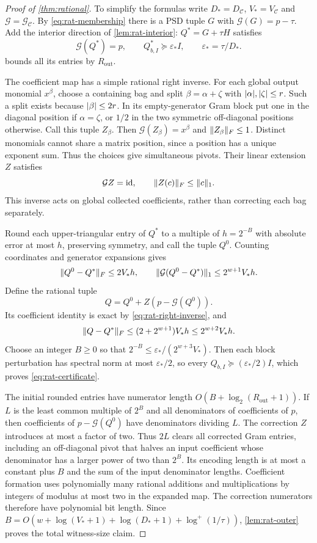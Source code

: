 \begin{proof}[Proof of \cref{thm:rational}]
To simplify the formulas write $D_*=D_{\mathcal C}$,
$V_*=V_{\mathcal C}$ and $\mathcal G=\mathcal G_{\mathcal C}$.
By \eqref{eq:rat-membership} there is a PSD tuple $G$ with
$\mathcal G(G)=p-\tau$. Add the interior direction of
\cref{lem:rat-interior}: $Q^*=G+\tau H$ satisfies
\[
 \mathcal G(Q^*)=p,\qquad Q^*_{b,I}\succeq\varepsilon_* I,
 \qquad\varepsilon_*=\tau/D_*.
\]
 bounds all its entries by $R_{\mathrm{out}}$.

The coefficient map has a simple rational right inverse. For each global
output monomial $x^\beta$, choose a containing bag and split
$\beta=\alpha+\zeta$ with $\lvert \alpha\rvert,\lvert \zeta\rvert\le r$.
Such a split exists because $\lvert \beta\rvert\le2r$.
In its empty-generator Gram block put one in the diagonal position if
$\alpha=\zeta$, or $1/2$ in the two symmetric off-diagonal positions
otherwise. Call this tuple $Z_\beta$. Then
$\mathcal G(Z_\beta)=x^\beta$ and $\lVert Z_\beta\rVert_F\le1$.
Distinct monomials cannot share a matrix position, since a position has a
unique exponent sum. Thus the choices give simultaneous pivots. Their
linear extension $Z$ satisfies
\begin{equation}\label{eq:rat-right-inverse}
 \mathcal G Z=\operatorname{id},\qquad \lVert Z(c)\rVert_F\le\lVert c\rVert_1.
\end{equation}
This inverse acts on global collected coefficients, rather than
correcting each bag separately.

Round each upper-triangular entry of $Q^*$ to a multiple of
$h=2^{-B}$ with absolute error at most $h$, preserving symmetry, and call
the tuple $Q^0$. Counting coordinates and generator expansions gives
\[
 \lVert Q^0-Q^*\rVert_F\le2V_*h,\qquad
 \lVert \mathcal G(Q^0-Q^*)\rVert_1\le2^{w+1}V_*h.
\]
Define the rational tuple
\begin{equation}\label{eq:rat-round-correct}
 Q=Q^0+Z(p-\mathcal G(Q^0)).
\end{equation}
Its coefficient identity is exact by \eqref{eq:rat-right-inverse}, and
\[
 \lVert Q-Q^*\rVert_F\le(2+2^{w+1})V_*h\le2^{w+2}V_*h.
\]
Choose an integer $B\ge0$ so that
$2^{-B}\le\varepsilon_*/(2^{w+3}V_*)$.
Then each block perturbation has spectral norm at most
$\varepsilon_*/2$, so every $Q_{b,I}\succeq(\varepsilon_*/2)I$,
which proves \eqref{eq:rat-certificate}.

The initial rounded entries have numerator length
$O(B+\log_2(R_{\mathrm{out}}+1))$. If $L$ is the least common multiple of
$2^B$ and all denominators of coefficients of $p$, then coefficients of
$p-\mathcal G(Q^0)$ have denominators dividing $L$. The correction $Z$
introduces at most a factor of two. Thus $2L$ clears all corrected Gram
entries, including an off-diagonal pivot that halves an input coefficient
whose denominator has a larger power of two than $2^B$. Its encoding
length is at most a constant plus $B$ and the sum of the input denominator
lengths. Coefficient formation uses polynomially many rational additions
and multiplications by integers of modulus at most two in the expanded
map. The correction numerators therefore have polynomial bit length.
Since $B=O(w+\log(V_*+1)+\log(D_*+1)+\log^+(1/\tau))$,
\cref{lem:rat-outer} proves the total witness-size claim.


\end{proof}

